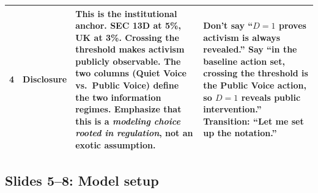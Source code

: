 \documentclass[9pt,a4paper]{extarticle}
\newcommand{\say}[1]{\textbf{#1}}
\newcommand{\avoid}[1]{\textcolor{ptrose}{#1}}
\begin{document}
{\begin{longtable}{@{}P{0.06\textwidth}P{0.14\textwidth}P{0.35\textwidth}P{0.37\textwidth}@{}}
4 & Disclosure &
\say{This is the institutional anchor.} SEC 13D at 5\%, UK at 3\%. Crossing the threshold makes activism publicly observable. The two columns (Quiet Voice vs.\ Public Voice) define the two information regimes. Emphasize that this is a \emph{modeling choice rooted in regulation}, not an exotic assumption. &
\avoid{Don't say ``$D=1$ proves activism is always revealed.''} Say ``in the baseline action set, crossing the threshold is the Public Voice action, so $D=1$ reveals public intervention.'' Transition: ``Let me set up the notation.'' \\
\bottomrule
\end{longtable}
}

\subsection{Slides 5--8: Model setup}
\end{document}
